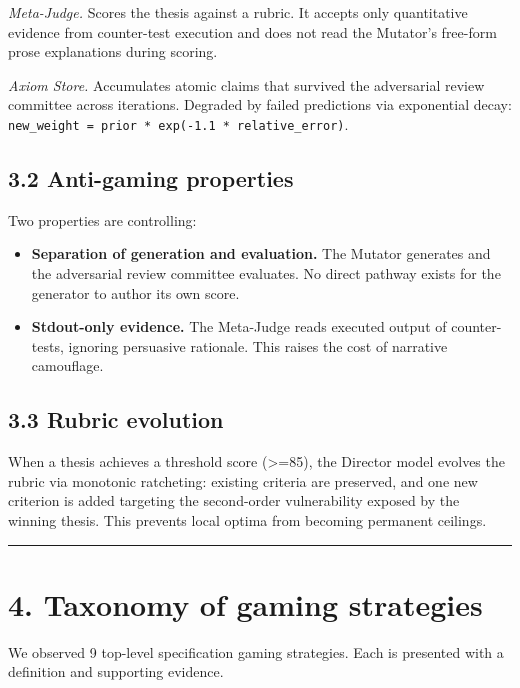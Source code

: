 \documentclass[
  11pt]{article}
\providecommand{\tightlist}{%
  \setlength{\itemsep}{0pt}\setlength{\parskip}{0pt}}
\begin{document}
\emph{Meta-Judge.} Scores the thesis against a rubric. It accepts only
quantitative evidence from counter-test execution and does not read the
Mutator's free-form prose explanations during scoring.

\emph{Axiom Store.} Accumulates atomic claims that survived the
adversarial review committee across iterations. Degraded by failed
predictions via exponential decay:
\texttt{new\_weight\ =\ prior\ *\ exp(-1.1\ *\ relative\_error)}.

\subsection{3.2 Anti-gaming properties}\label{anti-gaming-properties}

Two properties are controlling:

\begin{itemize}
\tightlist
\item
  \textbf{Separation of generation and evaluation.} The Mutator
  generates and the adversarial review committee evaluates. No direct
  pathway exists for the generator to author its own score.
\item
  \textbf{Stdout-only evidence.} The Meta-Judge reads executed output of
  counter-tests, ignoring persuasive rationale. This raises the cost of
  narrative camouflage.
\end{itemize}

\subsection{3.3 Rubric evolution}\label{rubric-evolution}

When a thesis achieves a threshold score (\textgreater=85), the Director
model evolves the rubric via monotonic ratcheting: existing criteria are
preserved, and one new criterion is added targeting the second-order
vulnerability exposed by the winning thesis. This prevents local optima
from becoming permanent ceilings.

\begin{center}\rule{0.5\linewidth}{0.5pt}\end{center}

\section{4. Taxonomy of gaming
strategies}\label{taxonomy-of-gaming-strategies}

We observed 9 top-level specification gaming strategies. Each is
presented with a definition and supporting evidence.
\end{document}
